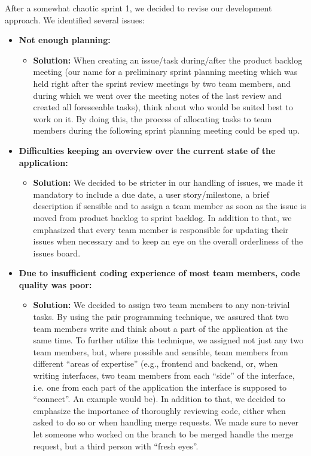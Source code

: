 After a somewhat chaotic sprint 1, we decided to revise our development approach. We identified several issues:

\begin{itemize}
    \item \textbf{Not enough planning:}
    \begin{itemize}
        \item \textbf{Solution:} When creating an issue/task during/after the product backlog meeting (our name for a preliminary sprint planning meeting which was held right after the sprint review meetings by two team members, and during which we went over the meeting notes of the last review and created all foreseeable tasks), think about who would be suited best to work on it. By doing this, the process of allocating tasks to team members during the following sprint planning meeting could be sped up.
    \end{itemize}
    \item \textbf{Difficulties keeping an overview over the current state of the application:}
    \begin{itemize}
        \item \textbf{Solution:} We decided to be stricter in our handling of issues, we made it mandatory to include a due date, a user story/milestone, a brief description if sensible and to assign a team member as soon as the issue is moved from product backlog to sprint backlog. In addition to that, we emphasized that every team member is responsible for updating their issues when necessary and to keep an eye on the overall orderliness of the issues board.
    \end{itemize}
    \item \textbf{Due to insufficient coding experience of most team members, code quality was poor:}
    \begin{itemize}
        \item \textbf{Solution:} We decided to assign two team members to any non-trivial tasks. By using the pair programming technique, we assured that two team members write and think about a part of the application at the same time. To further utilize this technique, we assigned not just any two team members, but, where possible and sensible, team members from different “areas of expertise” (e.g., frontend and backend, or, when writing interfaces, two team members from each “side” of the interface, i.e. one from each part of the application the interface is supposed to “connect”. An example would be). In addition to that, we decided to emphasize the importance of thoroughly reviewing code, either when asked to do so or when handling merge requests. We made sure to never let someone who worked on the branch to be merged handle the merge request, but a third person with “fresh eyes”.

\end{itemize}
\end{itemize}
